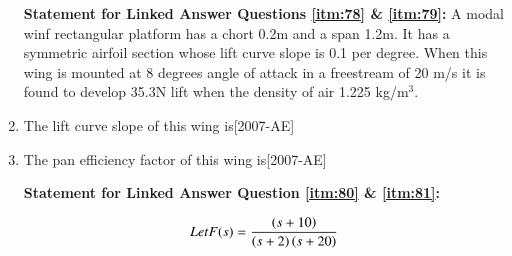 \documentclass[journal]{IEEEtran}
\begin{document}
\begin{enumerate}
\textbf{Statement for Linked Answer Questions \ref{itm:78} \& \ref{itm:79}:} A modal winf rectangular platform has a chort 0.2m and a span 1.2m. It has a symmetric airfoil section whose lift curve slope is 0.1 per degree. When this wing is mounted at 8 degrees angle of attack in a freestream of 20 m/s it is found to develop 35.3N lift when the density of air 1.225 kg/m$^3$.

    \item The lift curve slope of this wing is\label{itm:78}\hfill{[2007-AE]}
        \begin{enumerate}
        \end{enumerate}
    \item The pan efficiency factor of this wing is\label{itm:79}\hfill{[2007-AE]}
        \begin{enumerate}
        \end{enumerate}

\textbf{Statement for Linked Answer Question \ref{itm:80} \& \ref{itm:81}:}

$$Let F(s) = \frac{\left(s+10\right)}{\left(s+2\right)\left(s+20\right)}$$


\end{enumerate}
\end{document}
